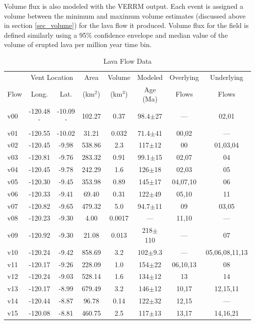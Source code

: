 \documentclass[12pt,letter]{article}
\begin{document}
Volume flux is also modeled with the VERRM output. Each event is assigned a volume between the minimum and maximum volume estimates (discussed above in section \ref{sec_volume}) for the lava flow it produced. Volume flux for the field is defined similarly using a 95\% confidence envelope and median value of the volume of erupted lava per million year time bin.


	\begin{table}[h!]
	\centering
	\caption{Lava Flow Data}
	\begin{tabular}{l c c c c c c c}
		\toprule
			 & \multicolumn{2}{c}{Vent Location}  & Area & Volume & Modeled & Overlying & Underlying\\
			Flow & Long. & Lat. & (km$^2$) & (km$^3$) & Age (Ma) & Flows & Flows\\
		\midrule
			v00 & -120.48$^{\circ}$ & -10.09$^{\circ}$ & 102.27 & 0.37 & 98.4$\pm$27 & --- & 02,01\\
			v01 & -120.55 & -10.02 & 31.21 & 0.032 & 71.4$\pm$41 & 00,02 & ---\\
			v02 & -120.45 & -9.98 & 538.86 & 2.3 & 117$\pm$12 & 00 & 01,03,04\\
			v03 & -120.81 & -9.76 & 283.32 & 0.91 & 99.1$\pm$15 & 02,07 & 04\\
			v04 & -120.45 & -9.78 & 242.29 & 1.6 & 126$\pm$18 & 02,03 & 05\\
			v05 & -120.30 & -9.45 & 353.98 & 0.89 & 145$\pm$17 & 04,07,10 & 06\\
			v06 & -120.33 & -9.41 & 69.40 & 0.31 & 122$\pm$49 & 05,10 & 11\\
			v07 & -120.82 & -9.65 & 479.32 & 5.0 & 94.7$\pm$11 & 09 & 03,05\\
			v08 & -120.23 & -9.30 & 4.00 & 0.0017 & --- & 11,10 & ---\\
			v09 & -120.92 & -9.30 & 21.08 & 0.013 & 218$\pm$110 & --- & 07\\
			v10 & -120.24 & -9.42 & 858.69 & 3.2 & 102$\pm$9.3 & --- & 05,06,08,11,13\\
			v11 & -120.17 & -9.26 & 228.09 & 1.0 & 154$\pm$22 & 06,10,13 & 08\\
			v12 & -120.24 & -9.03 & 528.14 & 1.6 & 134$\pm$12 & 13 & 14\\
			v13 & -120.17 & -8.99 & 679.49 & 3.2 & 146$\pm$12 & 10,17 & 12,15,11\\
			v14 & -120.44 & -8.87 & 96.78 & 0.14 & 122$\pm$32 & 12,15 & ---\\
			v15 & -120.08 & -8.81 & 460.75 & 2.5 & 117$\pm$13 & 13,17 & 14,16,21\\

\end{tabular}
\end{table}
\end{document}
